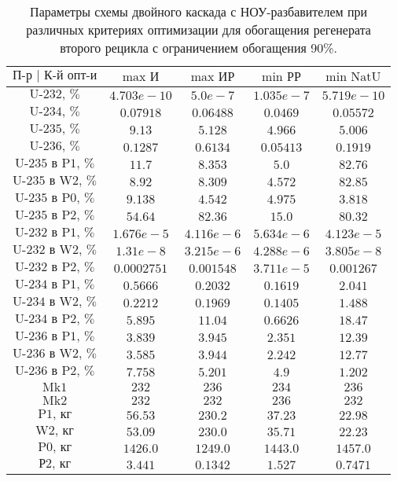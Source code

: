 \begin{table}
    \begin{tabular}{ccccc}
    $\text{П-р | К-й опт-и}$ & $\text{max И}$ & $\text{max ИР}$ & $\text{min РР}$ & $\text{min NatU}$\\ \hline
    $\text{U-232, \%}$ & $4.703e-10$ & $5.0e-7$ & $1.035e-7$ & $5.719e-10$\\ \hline
    $\text{U-234, \%}$ & $0.07918$ & $0.06488$ & $0.0469$ & $0.05572$\\ \hline
    $\text{U-235, \%}$ & $9.13$ & $5.128$ & $4.966$ & $5.006$\\ \hline
    $\text{U-236, \%}$ & $0.1287$ & $0.6134$ & $0.05413$ & $0.1919$\\ \hline
    $\text{U-235 в P1, \%}$ & $11.7$ & $8.353$ & $5.0$ & $82.76$\\ \hline
    $\text{U-235 в W2, \%}$ & $8.92$ & $8.309$ & $4.572$ & $82.85$\\ \hline
    $\text{U-235 в P0, \%}$ & $9.138$ & $4.542$ & $4.975$ & $3.818$\\ \hline
    $\text{U-235 в P2, \%}$ & $54.64$ & $82.36$ & $15.0$ & $80.32$\\ \hline
    $\text{U-232 в P1, \%}$ & $1.676e-5$ & $4.116e-6$ & $5.634e-6$ & $4.123e-5$\\ \hline
    $\text{U-232 в W2, \%}$ & $1.31e-8$ & $3.215e-6$ & $4.288e-6$ & $3.805e-8$\\ \hline
    $\text{U-232 в P2, \%}$ & $0.0002751$ & $0.001548$ & $3.711e-5$ & $0.001267$\\ \hline
    $\text{U-234 в P1, \%}$ & $0.5666$ & $0.2032$ & $0.1619$ & $2.041$\\ \hline
    $\text{U-234 в W2, \%}$ & $0.2212$ & $0.1969$ & $0.1405$ & $1.488$\\ \hline
    $\text{U-234 в P2, \%}$ & $5.895$ & $11.04$ & $0.6626$ & $18.47$\\ \hline
    $\text{U-236 в P1, \%}$ & $3.839$ & $3.945$ & $2.351$ & $12.39$\\ \hline
    $\text{U-236 в W2, \%}$ & $3.585$ & $3.944$ & $2.242$ & $12.77$\\ \hline
    $\text{U-236 в P2, \%}$ & $7.758$ & $5.201$ & $4.9$ & $1.202$\\ \hline
    $\text{Mk1}$ & $232$ & $236$ & $234$ & $236$\\ \hline
    $\text{Mk2}$ & $232$ & $232$ & $236$ & $232$\\ \hline
    $\text{P1, кг}$ & $56.53$ & $230.2$ & $37.23$ & $22.98$\\ \hline
    $\text{W2, кг}$ & $53.09$ & $230.0$ & $35.71$ & $22.23$\\ \hline
    $\text{P0, кг}$ & $1426.0$ & $1249.0$ & $1443.0$ & $1457.0$\\ \hline
    $\text{Р2, кг}$ & $3.441$ & $0.1342$ & $1.527$ & $0.7471$
\end{tabular}
\caption{Параметры схемы двойного каскада с НОУ-разбавителем при различных критериях оптимизации для обогащения регенерата второго рецикла с ограничением обогащения 90\%.{\label{2opt2_90}}}
\end{table}





